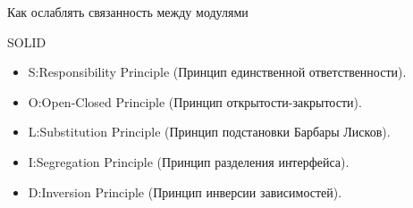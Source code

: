 \documentclass[10pt,pdf,hyperref={unicode}]{beamer}%
\begin{document}
\begin{frame}{}
  \begin{figure}[h]
  \end{figure}
\end{frame}

\begin{frame}{Как ослаблять связанность между модулями}

\begin{figure}[h]
\end{figure}

\end{frame}

\begin{frame}{SOLID}
\begin{itemize}
    \item S:\@Single Responsibility Principle (Принцип единственной ответственности).
    \item O:\@ Open-Closed Principle (Принцип открытости-закрытости).
    \item L:\@Liskov Substitution Principle (Принцип подстановки Барбары Лисков).
    \item I:\@Interface Segregation Principle (Принцип разделения интерфейса).
    \item D:\@Dependency Inversion Principle (Принцип инверсии зависимостей).
\end{itemize}
\end{frame}
\end{document}
